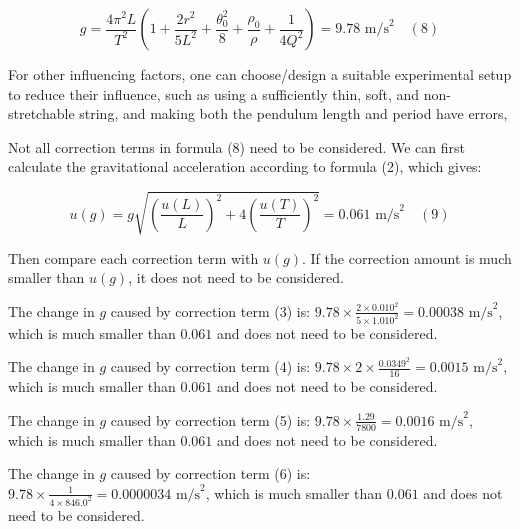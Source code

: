 \documentclass{report}
\begin{document}
\begin{equation}
    g = \frac{4\pi^2 L}{T^2} \left( 1 + \frac{2r^2}{5L^2} + \frac{\theta_0^2}{8} + \frac{\rho_0}{\rho} + \frac{1}{4Q^2} \right) = 9.78 \text{ m/s}^2 \quad (8)
\end{equation}

For other influencing factors, one can choose/design a suitable experimental setup to reduce their influence, such as using a sufficiently thin, soft, and non-stretchable string, and making both the pendulum length and period have errors,

Not all correction terms in formula (8) need to be considered. We can first calculate the gravitational acceleration according to formula (2), which gives:

\begin{equation}
    u(g) = g \sqrt{ \left( \frac{u(L)}{L} \right)^2 + 4 \left( \frac{u(T)}{T} \right)^2 } = 0.061 \text{ m/s}^2 \quad (9)
\end{equation}

Then compare each correction term with \(u(g)\). If the correction amount is much smaller than \(u(g)\), it does not need to be considered.

The change in \(g\) caused by correction term (3) is: \(9.78 \times \frac{2 \times 0.010^2}{5 \times 1.010^2} = 0.00038 \text{ m/s}^2\), which is much smaller than \(0.061\) and does not need to be considered.

The change in \(g\) caused by correction term (4) is: \(9.78 \times 2 \times \frac{0.0349^2}{16} = 0.0015 \text{ m/s}^2\), which is much smaller than \(0.061\) and does not need to be considered.

The change in \(g\) caused by correction term (5) is: \(9.78 \times \frac{1.29}{7800} = 0.0016 \text{ m/s}^2\), which is much smaller than \(0.061\) and does not need to be considered.

The change in \(g\) caused by correction term (6) is: \(9.78 \times \frac{1}{4 \times 846.0^2} = 0.0000034 \text{ m/s}^2\), which is much smaller than \(0.061\) and does not need to be considered.
\end{document}
